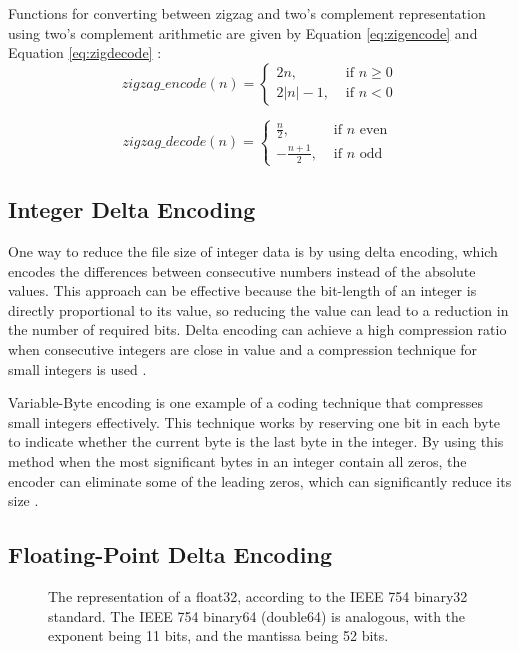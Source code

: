 Functions for converting between zigzag and two's complement representation using two's complement arithmetic are given by Equation \ref{eq:zigencode} and Equation \ref{eq:zigdecode} \cite{zigzagencoding}:
\begin{equation}
zigzag\_encode(n)= \begin{cases}2 n, & \text { if } n \geq 0 \\ 2 |n|-1, & \text { if } n<0\end{cases}
\label{eq:zigencode}
\end{equation}

\begin{equation}
zigzag\_decode(n) = \begin{cases}\frac{n}{2}, & \text { if } n \text { even } \\ -\frac{n+1}{2}, & \text { if } n \text{ odd } \end{cases}
\label{eq:zigdecode}
\end{equation}


\label{section:fpd}
\subsection{Integer Delta Encoding}
One way to reduce the file size of integer data is by using delta encoding, which encodes the differences between consecutive numbers instead of the absolute values. This approach can be effective because the bit-length of an integer is directly proportional to its value, so reducing the value can lead to a reduction in the number of required bits. Delta encoding can achieve a high compression ratio when consecutive integers are close in value and a compression technique for small integers is used \cite{intcomp}.

Variable-Byte encoding is one example of a coding technique that compresses small integers effectively. This technique works by reserving one bit in each byte to indicate whether the current byte is the last byte in the integer. By using this method when the most significant bytes in an integer contain all zeros, the encoder can eliminate some of the leading zeros, which can significantly reduce its size \cite{intcomp}.

\subsection{Floating-Point Delta Encoding}
\label{section:fpd_enc}
\begin{figure}[H]
    \centering
    
    \caption{The representation of a float32, according to the IEEE 754 binary32 standard. The IEEE 754 binary64 (double64) is analogous, with the exponent being 11 bits, and the mantissa being 52 bits.}
    \label{img:f32}
\end{figure}

